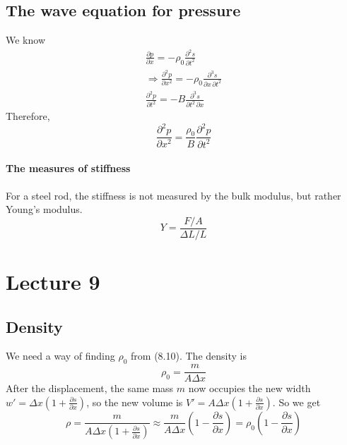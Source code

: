 \documentclass{report}
\numberwithin{equation}{section}
\newcommand{\pd}[2]{\frac{\partial #1}{\partial #2}}
\newcommand{\pdd}[2]{\frac{\partial^2 #1}{\partial #2^2}}
\begin{document}
\subsection{The wave equation for pressure}
We know
\begin{align*}
	\pd{p}{x}  = -\rho_0\pdd{s}{t}\\
	\Rightarrow \pdd{p}{x} = -\rho_0\frac{\partial^3 s}{\partial x\,\partial t^2}\\
	\pdd{p}{t} = -B\frac{\partial^3 s}{\partial t^2\,\partial x}
\end{align*}
Therefore,
\begin{equation}
	\pdd{p}{x} = \frac{\rho_0}{B}\pdd{p}{t}
\end{equation}
\paragraph{The measures of stiffness}
For a steel rod, the stiffness is not measured by the bulk modulus, but rather Young's modulus.
\begin{equation}
	Y = \frac{F/A}{\Delta L/L}
\end{equation}
\section{Lecture 9}
\subsection{Density}
We need a way of finding $\rho_0$ from (8.10). The density is
\begin{equation}
	\rho_0 = \frac{m}{A\Delta x}
\end{equation}
After the displacement, the same mass $m$ now occupies the new width $w' = \Delta x\left(1 + \pd{s}{x}\right)$, so the new volume is $V' = A\Delta x\left(1+\pd{s}{x}\right)$.
So we get
\begin{equation}
	\rho = \frac{m}{A\Delta x \left(1 + \pd{s}{x}\right)}\approx \frac{m}{A\Delta x}\left(1-\pd{s}{x}\right) = \rho_0\left(1-\pd{s}{x}\right)
\end{equation}
\end{document}
